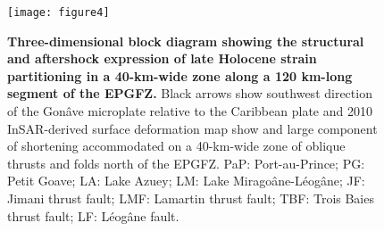 \documentclass{nature}
\begin{document}
\begin{figure}
\centering
\texttt{[image: figure4]}
\caption{\textbf{Three-dimensional block diagram showing the structural and aftershock expression of late Holocene strain partitioning in a 40-km-wide zone along a 120 km-long segment of the EPGFZ.} Black arrows show southwest direction of the Gon\^ave microplate relative to the Caribbean plate and 2010 InSAR-derived surface deformation map show and large component of shortening accommodated on a 40-km-wide zone of oblique thrusts and folds north of the EPGFZ. PaP: Port-au-Prince; PG: Petit Goave; LA: Lake Azuey; LM: Lake Mirago\^ane-L\'eog\^ane; JF: Jimani thrust fault; LMF: Lamartin thrust fault; TBF: Trois Baies thrust fault; LF: L\'eog\^ane fault.}
\label{figure4}
\end{figure}
\end{document}
